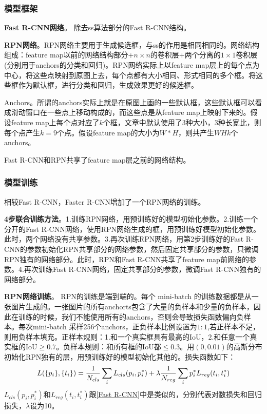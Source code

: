 \documentclass[]{article}
\begin{document}
\subsubsection{模型框架}
\textbf{Fast R-CNN网络}。
除去ss算法部分的Fast R-CNN结构。

\textbf{RPN网络}。RPN网络主要用于生成候选框，与ss的作用是相同相同的。网络结构组成：feature map以前的网络结构部分+$n\times n$的卷积层+两个分离的$1\times 1$卷积层(分别用于anchors的分类和回归)。RPN网络实际上以feature map层上的每个点为中心，将这些点映射到原图上去，每个点都有大小相同、形式相同的多个框。将这些框作为默认框，进行分类和回归，生成效果更好的候选框。

Anchors。所谓的anchors实际上就是在原图上画的一些默认框，这些默认框可以看成滑动窗口在一些点上移动构成的，而这些点是从feature map上映射下来的。假设feature map上每个点对应了$k$个框，文章中默认使用了3种大小，3种长宽比，则每个点产生$k=9$个点。假设feature map的大小为$W*H$，则共产生$WHk$个anchors。

Fast R-CNN和RPN共享了feature map层之前的网络结构。

\subsubsection{模型训练}
相较Fast R-CNN，Faster R-CNN增加了一个RPN网络的训练。

\textbf{4步联合训练方法}。1.训练RPN网络，用预训练好的模型初始化参数。2.训练一个分开的Fast R-CNN网络，使用RPN网络生成的框，用预训练好模型初始化参数。此时，两个网络没有共享参数。3.再次训练RPN网络，用第2步训练好的Fast R-CNN的参数初始化RPN共享部分的网络参数，然后固定共享部分的参数，只微调RPN独有的网络部分。此时，RPN和Fast R-CNN共享了feature map前网络的参数。4.再次训练Fast R-CNN网络，固定共享部分的参数，微调Fast R-CNN独有的网络部分。

\textbf{RPN网络训练}。
RPN的训练是端到端的。每个 mini-batch 的训练数据都是从一张图片生成的。一张图片的所有anchorts包含了大量的负样本和少量的负样本，因此在训练的时候，我们不能使用所有的anchors，否则会导致损失函数偏向负样本。每次mini-batch 采样256个anchors，正负样本比例设置为$1:1$,若正样本不足，则用负样本填充。正样本规则：1.和一个真实框具有最高的IoU，2.和任意一个真实框的IoU$\ge 0.7$。负样本规则：和所有框的IoU都$\le 0.3$。用$(0,0.01)$的高斯分布初始化RPN独有的层，用预训练好的模型初始化其他的。损失函数如下：
\begin{equation}
L(\{p_i\},\{t_i\})=
\frac{1}{N_{cls}}\sum_{i}L_{cls}(p_i,p_i^*)\\
+\lambda \frac{1}{N_{reg}}\sum_{i}p_i^* L_{reg}(t_i,t_i^*)
\end{equation}
$L_{cls}(p_i,p_i^*)$和$L_{reg}(t_i,t_i^*)$跟\ref{Fast R-CNN}中是类似的，分别代表对数损失和回归损失，$\lambda$设为10。
\end{document}
